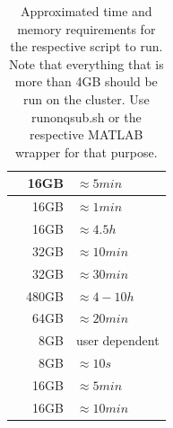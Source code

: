 \documentclass[12pt,a4paper]{scrartcl}
\begin{document}
\begin{table}[h]
\begin{tabular}{l | r | l}
  \nameref{sh:getLyrW} & 16GB & $\approx 5min$ \\\hline
  \nameref{sh:msklbl} & 16GB & $\approx 1min$ \\\hline
  \nameref{sh:prepcoreg} & 16GB & $\approx 4.5h$ \\\hline
  \nameref{sh:prepfct} & 32GB & $\approx 10min$ \\\hline
  \nameref{sh:realign} & 32GB & $\approx 30min$ \\\hline
  \nameref{sh:splitanalyzePRF} & 480GB & $\approx 4-10h$ \\\hline
  \nameref{sh:tseriesinterp} & 64GB & $\approx 20min$ \\\hline
  \nameref{sh:GUI2ROI} & 8GB & user dependent \\\hline
  \nameref{sh:lbl2msk} & 8GB & $\approx 10s$ \\\hline
  \nameref{sh:mkOver} & 16GB & $\approx 5min$\\\hline
  \nameref{sh:mkprfO} & 16GB & $\approx 10min$ \\\bottomrule
\end{tabular}
\caption[Approximated time and memory requirements when running on qsub]{Approximated time and memory requirements for the respective script to run. Note that everything that is more than 4GB should be run on the cluster. Use runonqsub.sh or the respective MATLAB wrapper for that purpose.}
\label{tab:hardwarerequirements}
\end{table}
\end{document}
